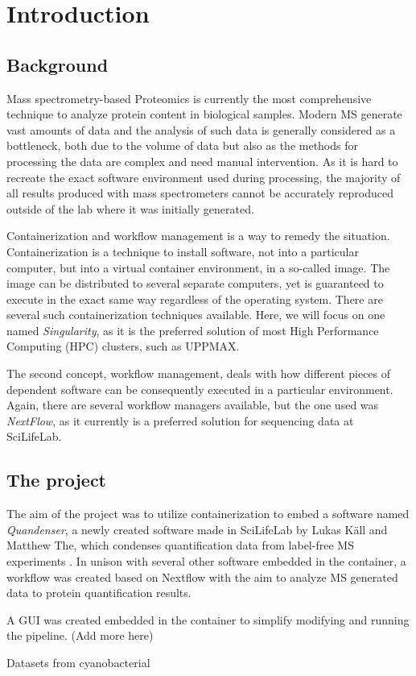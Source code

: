\section{Introduction}

\subsection{Background}

Mass spectrometry-based Proteomics is currently the most comprehensive technique to analyze protein content in biological samples. Modern MS generate vast amounts of data and the analysis of such data is generally considered as a bottleneck, both due to the volume of data but also as the methods for processing the data are complex and need manual intervention. As it is hard to recreate the exact software environment used during processing, the majority of all results produced with mass spectrometers cannot be accurately reproduced outside of the lab where it was initially generated.

Containerization and workflow management is a way to remedy the situation. Containerization is a technique to install software, not into a particular computer, but into a virtual container environment, in a so-called image. The image can be distributed to several separate computers, yet is guaranteed to execute in the exact same way regardless of the operating system. There are several such containerization techniques available. Here, we will focus on one named \textit{Singularity}, as it is the preferred solution of most High Performance Computing (HPC) clusters, such as UPPMAX.

The second concept, workflow management, deals with how different pieces of dependent software can be consequently executed in a particular environment. Again, there are several workflow managers available, but the one used was \textit{NextFlow}, as it currently is a preferred solution for sequencing data at SciLifeLab.

\subsection{The project}

The aim of the project was to utilize containerization to embed a software named \textit{Quandenser}, a newly created software made in SciLifeLab by Lukas Käll and Matthew The, which condenses quantification data from label-free MS experiments \cite{quandenser}. In unison with several other software embedded in the container, a workflow was created based on Nextflow with the aim to analyze MS generated data to protein quantification results.

A GUI was created embedded in the container to simplify modifying and running the pipeline.  (Add more here)

Datasets from cyanobacterial
